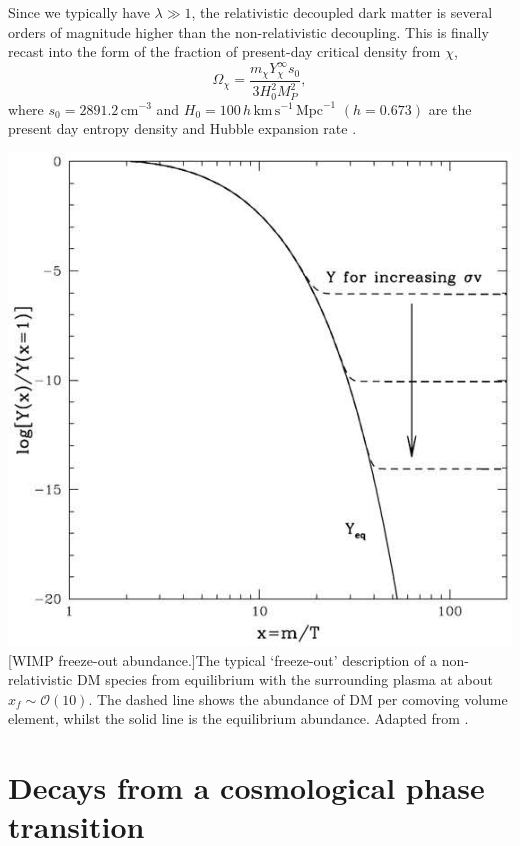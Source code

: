 Since we typically have $\lambda \gg 1$, the relativistic decoupled dark matter is several orders of magnitude higher than the non-relativistic decoupling. This is finally recast into the form of the fraction of present-day critical density from $\chi$,
\begin{equation}
\Omega_{\chi} = \frac{m_{\chi}Y^{\infty}_{\chi} s_0}{3 H^2_0 M^2_P},
\end{equation}
where $s_0=2891.2\,\text{cm}^{-3}$ and $H_0=100\,h\,\text{km}\, \text{s}^{-1}\,\text{Mpc}^{-1}$ $(h=0.673)$ are the present day entropy density and Hubble expansion rate \cite{RN493}.

\begin{center}
\includegraphics[width=0.6\linewidth]{figures/KolbTurner.jpg}
[WIMP freeze-out abundance.]{The typical `freeze-out' description of a non-relativistic DM species from equilibrium with the surrounding plasma at about $x_f \sim \mathcal{O}(10)$. The dashed line shows the abundance of DM per comoving volume element, whilst the solid line is the equilibrium abundance. Adapted from \cite{RN681}.}
\label{fig:KolbTurner}
\end{center}

\section{Decays from a cosmological phase transition}
\label{sec:Decays}

